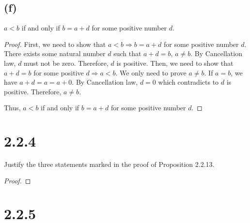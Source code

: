 \documentclass[12pt, letter]{article}
\begin{document}
\subsection*{(f)}
$a<b$ if and only if $b=a+d$ for some positive number $d$.
\begin{proof}
    First, we need to show that $a<b\Rightarrow b=a+d$ for some positive number $d$. There exists some natural number $d$ such that
    $a+d=b$, $a\ne b$. By Cancellation law, $d$ must not be zero. Therefore, $d$ is positive. Then, we need to show that $a+d=b$ for some positive $d\Rightarrow a<b$. We only need to prove $a\ne b$.
    If $a=b$, we have $a+d=a=a+0$. By Cancellation law, $d=0$ which contradicts to $d$ is positive. Therefore, $a\ne b$.
    
    Thus, $a<b$ if and only if $b=a+d$ for some positive number $d$.
\end{proof}
\section*{2.2.4}
Justify the three statements marked in the proof of Proposition 2.2.13. 
\begin{proof}
    
\end{proof}
\section*{2.2.5}
\end{document}
